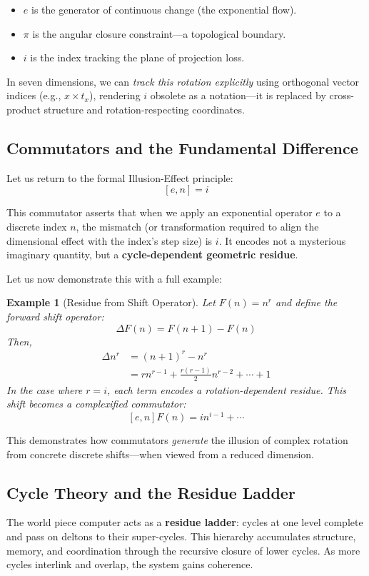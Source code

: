 \documentclass{article}
\newtheorem{example}{Example}
\begin{document}
\begin{itemize}
    \item \( e \) is the generator of continuous change (the exponential flow).
    \item \( \pi \) is the angular closure constraint---a topological boundary.
    \item \( i \) is the index tracking the plane of projection loss.
\end{itemize}

In seven dimensions, we can \textit{track this rotation explicitly} using orthogonal vector indices (e.g., \( x \times t_x \)), rendering \( i \) obsolete as a notation---it is replaced by cross-product structure and rotation-respecting coordinates.

\subsection*{Commutators and the Fundamental Difference}
Let us return to the formal Illusion-Effect principle:
\[ [e, n] = i \]

This commutator asserts that when we apply an exponential operator \( e \) to a discrete index \( n \), the mismatch (or transformation required to align the dimensional effect with the index's step size) is \( i \). It encodes not a mysterious imaginary quantity, but a \textbf{cycle-dependent geometric residue}.

Let us now demonstrate this with a full example:

\begin{example}[Residue from Shift Operator]
Let \( F(n) = n^r \) and define the forward shift operator:
\[ \Delta F(n) = F(n+1) - F(n) \]
Then,
\begin{align*}
\Delta n^r &= (n+1)^r - n^r \\
&= r n^{r-1} + \frac{r(r-1)}{2}n^{r-2} + \cdots + 1
\end{align*}
In the case where \( r = i \), each term encodes a rotation-dependent residue. This shift becomes a complexified commutator:
\[ [e, n]F(n) = i n^{i - 1} + \cdots \]
\end{example}

This demonstrates how commutators \textit{generate} the illusion of complex rotation from concrete discrete shifts---when viewed from a reduced dimension.

\subsection*{Cycle Theory and the Residue Ladder}
The world piece computer acts as a \textbf{residue ladder}: cycles at one level complete and pass on deltons to their super-cycles. This hierarchy accumulates structure, memory, and coordination through the recursive closure of lower cycles. As more cycles interlink and overlap, the system gains coherence.
\end{document}
